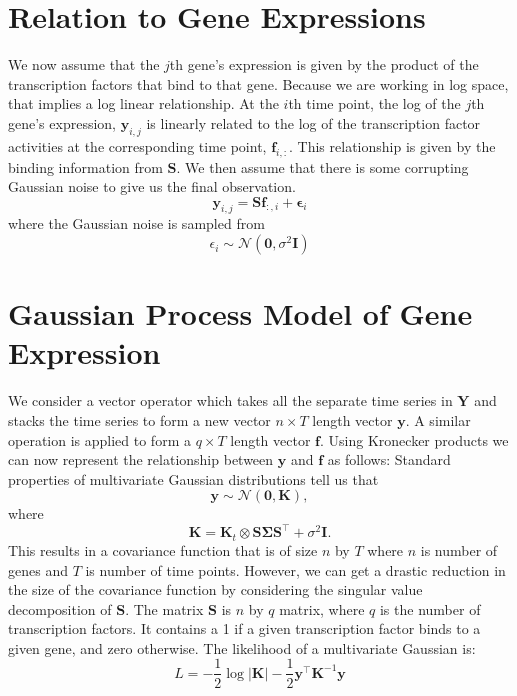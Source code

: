 \section{Relation to Gene Expressions}

We now assume that the $j$th gene's expression is given by the product of the transcription factors that bind to that gene. Because we are working in log space, that implies a log linear relationship. At the $i$th time point, the log of the $j$th gene's expression, $\mathbf{y}_{i,j}$ is linearly related to the log of the transcription factor activities at the corresponding time point, $\mathbf{f}_{i, :}$. This relationship is given by the binding information from $\mathbf{S}$. We then assume that there is some corrupting Gaussian noise to give us the final observation.
\begin{equation} \label{eq:yij}
  \mathbf{y}_{i, j} = \mathbf{S}\mathbf{f}_{:, i} + \boldsymbol{\epsilon}_i
\end{equation}  
where the Gaussian noise is sampled from
\begin{equation} \label{eq:epsi}
  \epsilon_i \sim \mathcal{N}(\mathbf{0}, \sigma^2 \mathbf{I})
\end{equation}

\section{Gaussian Process Model of Gene Expression}

We consider a vector operator which takes all the separate time series in $\mathbf{Y}$ and stacks the time series to form a new vector $n\times T$ length vector $\mathbf{y}$. A similar operation is applied to form a $q \times T$ length vector $\mathbf{f}$. Using Kronecker products we can now represent the relationship between $\mathbf{y}$ and $\mathbf{f}$ as follows: Standard properties of multivariate Gaussian distributions tell us that
\begin{equation} \label{eq:mGPd}
\mathbf{y} \sim \mathcal{N}(\mathbf{0}, \mathbf{K}),
\end{equation}
where
\begin{equation} \label{eq:K}
\mathbf{K} = \mathbf{K}_t \otimes \mathbf{S} \boldsymbol{\Sigma} \mathbf{S}^\top + \sigma^2 \mathbf{I}.
\end{equation}
This results in a covariance function that is of size $n$ by $T$ where $n$ is number of genes and $T$ is number of time points. However, we can get a drastic reduction in the size of the covariance function by considering the singular value decomposition of $\mathbf{S}$. The matrix $\mathbf{S}$ is $n$ by $q$ matrix, where $q$ is the number of transcription factors. It contains a 1 if a given transcription factor binds to a given gene, and zero otherwise. The likelihood of a multivariate Gaussian is:
\begin{equation} \label{eq:Likelihood}
L = -\frac{1}{2} \log |\mathbf{K}| - \frac{1}{2} \mathbf{y}^\top \mathbf{K}^{-1} \mathbf{y}
\end{equation}

